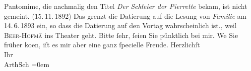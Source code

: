 \begin{ledgroupsized}[t]{13cm}
{{{                  Pantomime, die nachmalig den Titel \emph{Der Schleier
                     der Pierrette} bekam, ist nicht gemeint. (15. 11. 1892) Das grenzt die Datierung auf die
                  Lesung von \emph{Familie} am 14. 6. 1893 ein, so
                  dass die Datierung auf den Vortag wahrscheinlich ist.}}}\label{K_L02954-1h}, weil \textsc{Beer-Hofma{\geminationn}}̄ ins Theater geht. Bitte ſehr, ſeien {\pb}Sie pünktlich bei mir. We{\geminationn} Sie früher ko{\geminationm}en, iſt es mir aber eine ganz ſpecielle Freude. \pend
           \pstart
           {\pb}Herzlichſt {\\[\baselineskip]}Ihr {\\[\baselineskip]}\spacefill\mbox{ArthSch}\pend
           \leftskip=0em{}
         
         \endnumbering{}\end{ledgroupsized}\begin{anhang}\end{anhang}\newcommand{\dateiname}{L02954}\newcommand{\titel}{Arthur Schnitzler an Felix Salten, [13. 6. 1893?]}\newcommand{\editorInnen}{Martin Anton Müller und Laura Untner}
      